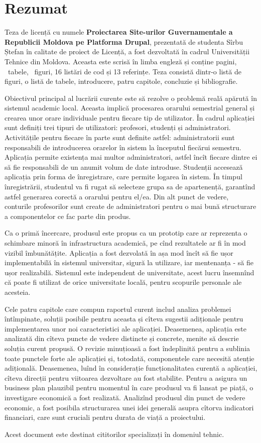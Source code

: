 \section*{Rezumat}
Teza de licență cu numele \textbf{Proiectarea Site-urilor Guvernamentale a Republicii Moldova pe Platforma Drupal}, prezentată de studenta Sîrbu Ștefan în calitate de proiect de Licență, a fost dezvoltată în cadrul Universității Tehnice din Moldova. Aceasta este scrisă în limba engleză și conține  \pageref{LastPage} pagini, \totaltables\ tabele, \totalfigures\ figuri, 16 listări de cod și 13 referințe. Teza consistă dintr-o listă de figuri, o listă de tabele, introducere, patru capitole, concluzie și bibliografie.

Obiectivul principal al lucrării curente este să rezolve o problemă reală apărută în sistemul academic local. Aceasta implică procesarea orarului semestrial general și crearea unor orare individuale pentru fiecare tip de utilizator. În cadrul aplicației sunt definiți trei tipuri de utilizatori: profesori, studenți și administratori. Activitățile pentru fiecare în parte sunt definite astfel: administratorii sunt responsabili de introducerea orarelor în sistem la începutul fiecărui semestru. Aplicația permite existența mai multor administratori, astfel încît fiecare dintre ei să fie responsabili de un anumit volum de date introduse. Studenții accesează aplicația prin forma de înregistrare, care permite logarea în sistem. În timpul înregistrării, studentul va fi rugat să selecteze grupa sa de apartenență, garantînd astfel generarea corectă a orarului pentru el/ea. Din alt punct de vedere, conturile profesorilor sunt create de administratori pentru o mai bună structurare a componentelor ce fac parte din produs.

Ca o primă încercare, produsul este propus ca un prototip care ar reprezenta o schimbare minoră în infrastructura academică, pe cînd rezultatele ar fi în mod vizibil îmbunătățite. Aplicația a fost dezvolată în așa mod încît să fie ușor implementabilă în sistemul universitar, sigură la utilizare, iar mentenanța - să fie ușor realizabilă. Sistemul este independent de universitate, acest lucru însemnînd că poate fi utilizat de orice universitate locală, pentru scopurile personale ale acesteia. 

Cele patru capitole care compun raportul curent includ analiza problemei întîmpinate, soluții posibile pentru aceasta și cîteva sugestii adiționale pentru implementarea unor noi caracteristici ale aplicației. Deasemenea, aplicația este analizată din cîteva puncte de vedere distincte și concrete, menite să descrie soluția curent propusă. O revizie minuțioasă a fost îndeplinită pentru a sublinia toate punctele forte ale aplicației și, totodată, componentele care necesită atenție adițională. Deasemenea, luînd în considerație funcționalitatea curentă a aplicației, cîteva direcții pentru viitoarea dezvoltare au fost stabilite. Pentru a asigura un business plan plauzibil pentru momentul în care produsul va fi lansat pe piață, o investigare economică a fost realizată. Analizînd produsul din punct de vedere economic, a fost posibila structurarea unei  idei generală asupra cîtorva indicatori financiari, care sunt cruciali pentru durata de viață a proiectului.

Acest document este destinat cititorilor specializați în domeniul tehnic.



